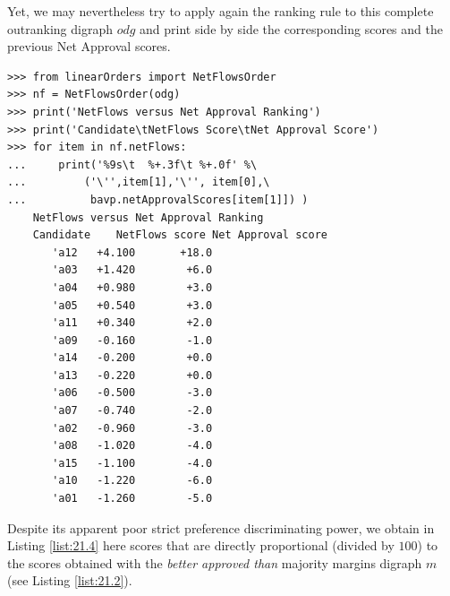 Yet, we may nevertheless try to apply again the \NetFlows ranking rule to this complete outranking digraph $odg$ and print side by side the corresponding \NetFlows scores and the previous Net Approval scores. 
\begin{lstlisting}[caption={Comparing the \NetFlows and the Net Approval rankings},label=list:21.4]
>>> from linearOrders import NetFlowsOrder
>>> nf = NetFlowsOrder(odg)
>>> print('NetFlows versus Net Approval Ranking')
>>> print('Candidate\tNetFlows Score\tNet Approval Score')
>>> for item in nf.netFlows:
...     print('%9s\t  %+.3f\t %+.0f' %\
...         ('\'',item[1],'\'', item[0],\
...          bavp.netApprovalScores[item[1]]) )  
    NetFlows versus Net Approval Ranking
    Candidate    NetFlows score	Net Approval score
       'a12	  +4.100	   +18.0
       'a03	  +1.420	    +6.0
       'a04	  +0.980	    +3.0
       'a05	  +0.540	    +3.0
       'a11	  +0.340	    +2.0
       'a09	  -0.160	    -1.0
       'a14	  -0.200	    +0.0
       'a13	  -0.220	    +0.0
       'a06	  -0.500	    -3.0
       'a07	  -0.740	    -2.0
       'a02	  -0.960	    -3.0
       'a08	  -1.020	    -4.0
       'a15	  -1.100	    -4.0
       'a10	  -1.220	    -6.0
       'a01	  -1.260	    -5.0
\end{lstlisting}
Despite its apparent poor strict preference discriminating power, we obtain in Listing \ref{list:21.4} here \NetFlows scores that are directly proportional (divided by $100$) to the scores obtained with the \emph{better approved than} majority margins digraph $m$ (see Listing \ref{list:21.2}).

